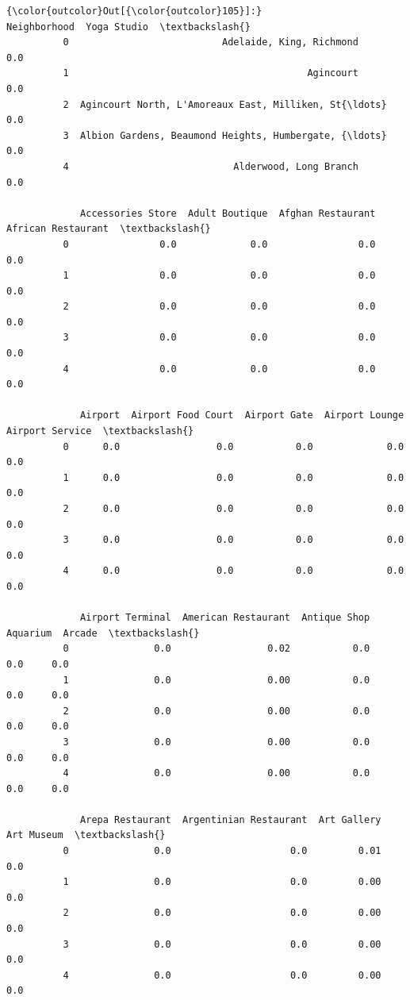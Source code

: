 \documentclass[11pt]{article}
\begin{document}
\begin{Verbatim}[commandchars=\\\{\}]
{\color{outcolor}Out[{\color{outcolor}105}]:}                                         Neighborhood  Yoga Studio  \textbackslash{}
          0                           Adelaide, King, Richmond          0.0   
          1                                          Agincourt          0.0   
          2  Agincourt North, L'Amoreaux East, Milliken, St{\ldots}          0.0   
          3  Albion Gardens, Beaumond Heights, Humbergate, {\ldots}          0.0   
          4                             Alderwood, Long Branch          0.0   
          
             Accessories Store  Adult Boutique  Afghan Restaurant  African Restaurant  \textbackslash{}
          0                0.0             0.0                0.0                 0.0   
          1                0.0             0.0                0.0                 0.0   
          2                0.0             0.0                0.0                 0.0   
          3                0.0             0.0                0.0                 0.0   
          4                0.0             0.0                0.0                 0.0   
          
             Airport  Airport Food Court  Airport Gate  Airport Lounge  Airport Service  \textbackslash{}
          0      0.0                 0.0           0.0             0.0              0.0   
          1      0.0                 0.0           0.0             0.0              0.0   
          2      0.0                 0.0           0.0             0.0              0.0   
          3      0.0                 0.0           0.0             0.0              0.0   
          4      0.0                 0.0           0.0             0.0              0.0   
          
             Airport Terminal  American Restaurant  Antique Shop  Aquarium  Arcade  \textbackslash{}
          0               0.0                 0.02           0.0       0.0     0.0   
          1               0.0                 0.00           0.0       0.0     0.0   
          2               0.0                 0.00           0.0       0.0     0.0   
          3               0.0                 0.00           0.0       0.0     0.0   
          4               0.0                 0.00           0.0       0.0     0.0   
          
             Arepa Restaurant  Argentinian Restaurant  Art Gallery  Art Museum  \textbackslash{}
          0               0.0                     0.0         0.01         0.0   
          1               0.0                     0.0         0.00         0.0   
          2               0.0                     0.0         0.00         0.0   
          3               0.0                     0.0         0.00         0.0   
          4               0.0                     0.0         0.00         0.0   
          

\end{Verbatim}
\end{document}

